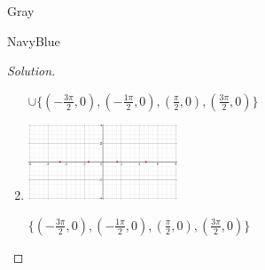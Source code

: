 \documentclass[12pt]{amsart}
\theoremstyle{named}
\newenvironment{soln}
{\begin{color}{Gray}\begin{framed}\begin{color}{NavyBlue}\begin{proof}[Solution]
\doublespacing}
{\end{proof}\end{color}\end{framed}\end{color}}
\theoremstyle{definition}
\begin{document}
\begin{soln}
\begin{enumerate}
		$\cup \{(-\frac{3\pi}{2},0),(-\frac{1\pi}{2},0),(\frac{\pi}{2},0),(\frac{3\pi}{2},0)\}$

		\item \phantom{ }
		
		\includegraphics[width=12em]{media/3.3-3.5.png}

		$\{(-\frac{3\pi}{2},0),(-\frac{1\pi}{2},0),(\frac{\pi}{2},0),(\frac{3\pi}{2},0)\}$
	\end{enumerate}
\end{soln}
\end{document}
